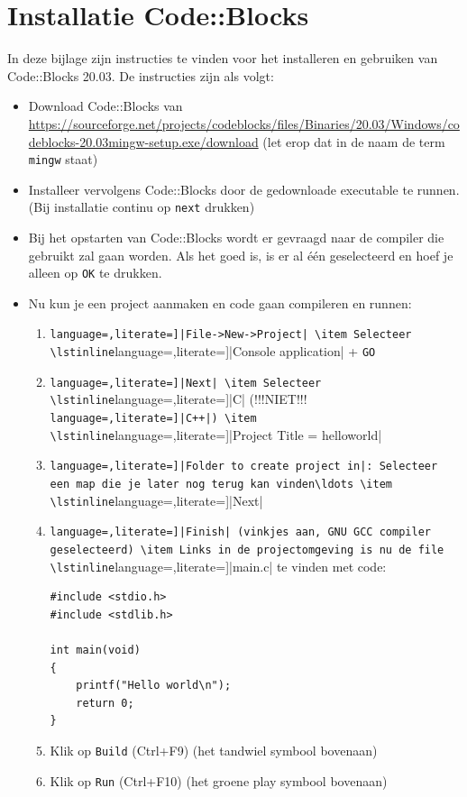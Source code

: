 \documentclass[a4paper,10pt,fleqn,twoside]{article}
\begin{document}
\section{Installatie Code::Blocks}
\label{sec:installcodeblocks}

In deze bijlage zijn instructies te vinden voor het installeren en gebruiken van Code::Blocks 20.03. De instructies zijn als volgt:

\begin{itemize}
\item Download Code::Blocks van \url{https://sourceforge.net/projects/codeblocks/files/Binaries/20.03/Windows/codeblocks-20.03mingw-setup.exe/download} (let erop dat in de naam de term \texttt{mingw} staat)
\item Installeer vervolgens Code::Blocks door de gedownloade executable te runnen. (Bij installatie continu op \texttt{next} drukken)
\item Bij het opstarten van Code::Blocks wordt er gevraagd naar de compiler die gebruikt zal gaan worden. Als het goed is, is er al \'e\'en geselecteerd en hoef je alleen op \texttt{OK} te drukken.
\item Nu kun je een project aanmaken en code gaan compileren en runnen:
\begin{enumerate}[label=\alph*.]
\item \lstinline[language=,literate=]|File->New->Project|
\item Selecteer \lstinline[language=,literate=]|Console application| + \lstinline|GO|
\item \lstinline[language=,literate=]|Next|
\item Selecteer \lstinline[language=,literate=]|C| (!!!NIET!!! \lstinline[language=,literate=]|C++|)
\item \lstinline[language=,literate=]|Project Title = helloworld|
\item \lstinline[language=,literate=]|Folder to create project in|: Selecteer een map die je later nog terug kan vinden\ldots
\item \lstinline[language=,literate=]|Next|
\item \lstinline[language=,literate=]|Finish| (vinkjes aan, GNU GCC compiler geselecteerd)
\item Links in de projectomgeving is nu de file \lstinline[language=,literate=]|main.c| te vinden met code:

\begin{lstlisting}
#include <stdio.h>
#include <stdlib.h>

int main(void)
{
    printf("Hello world\n");
    return 0;
}
\end{lstlisting}
\item Klik op \lstinline|Build| (Ctrl+F9) (het tandwiel symbool bovenaan)
\item Klik op \lstinline|Run| (Ctrl+F10) (het groene play symbool bovenaan)
\end{enumerate}
\end{itemize}
\end{document}

